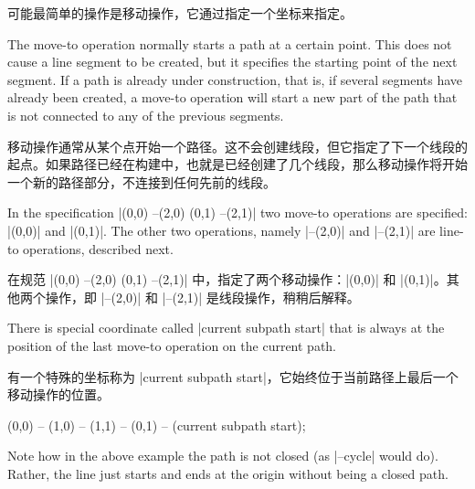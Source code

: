 可能最简单的操作是移动操作，它通过指定一个坐标来指定。

\begin{pathoperation}[noindex]{}{}
    The move-to operation normally starts a path at a certain point. This does
    not cause a line segment to be created, but it specifies the starting point
    of the next segment. If a path is already under construction, that is, if
    several segments have already been created, a move-to operation will start
    a new part of the path that is not connected to any of the previous
    segments.

    移动操作通常从某个点开始一个路径。这不会创建线段，但它指定了下一个线段的起点。如果路径已经在构建中，也就是已经创建了几个线段，那么移动操作将开始一个新的路径部分，不连接到任何先前的线段。

\begin{codeexample}[]
\end{codeexample}

    In the specification |(0,0) --(2,0) (0,1) --(2,1)| two move-to operations
    are specified: |(0,0)| and |(0,1)|. The other two operations, namely
    |--(2,0)| and |--(2,1)| are line-to operations, described next.

    在规范 |(0,0) --(2,0) (0,1) --(2,1)| 中，指定了两个移动操作：|(0,0)| 和 |(0,1)|。其他两个操作，即 |--(2,0)| 和 |--(2,1)| 是线段操作，稍稍后解释。

\end{pathoperation}

There is special coordinate called |current subpath start| that is always at
the position of the last move-to operation on the current path.
%

有一个特殊的坐标称为 |current subpath start|，它始终位于当前路径上最后一个移动操作的位置。

\begin{codeexample}[]
\tikz [line width=2mm]
  \draw (0,0) -- (1,0) -- (1,1)
        -- (0,1) -- (current subpath start);
\end{codeexample}

Note how in the above example the path is not closed (as |--cycle| would do).
Rather, the line just starts and ends at the origin without being a closed
path.

